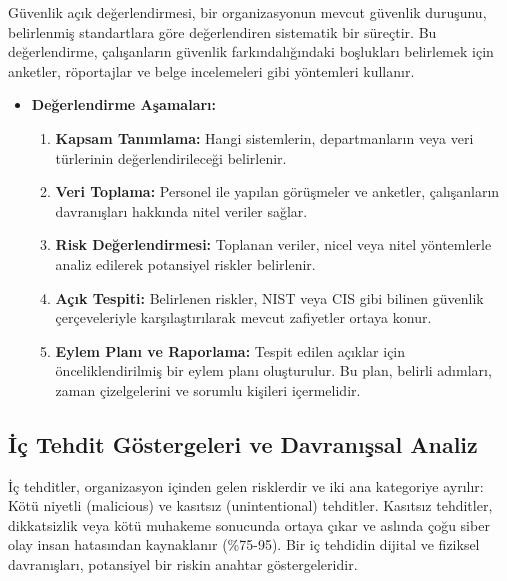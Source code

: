 Güvenlik açık değerlendirmesi, bir organizasyonun mevcut güvenlik duruşunu, belirlenmiş standartlara göre değerlendiren sistematik bir süreçtir. Bu değerlendirme, çalışanların güvenlik farkındalığındaki boşlukları belirlemek için anketler, röportajlar ve belge incelemeleri gibi yöntemleri kullanır.
\begin{itemize}
    \item \textbf{Değerlendirme Aşamaları:}
    \begin{enumerate}
        \item \textbf{Kapsam Tanımlama:} Hangi sistemlerin, departmanların veya veri türlerinin değerlendirileceği belirlenir.
        \item \textbf{Veri Toplama:} Personel ile yapılan görüşmeler ve anketler, çalışanların davranışları hakkında nitel veriler sağlar.
        \item \textbf{Risk Değerlendirmesi:} Toplanan veriler, nicel veya nitel yöntemlerle analiz edilerek potansiyel riskler belirlenir.
        \item \textbf{Açık Tespiti:} Belirlenen riskler, NIST veya CIS gibi bilinen güvenlik çerçeveleriyle karşılaştırılarak mevcut zafiyetler ortaya konur.
        \item \textbf{Eylem Planı ve Raporlama:} Tespit edilen açıklar için önceliklendirilmiş bir eylem planı oluşturulur. Bu plan, belirli adımları, zaman çizelgelerini ve sorumlu kişileri içermelidir.
    \end{enumerate}
\end{itemize}

\subsection{İç Tehdit Göstergeleri ve Davranışsal Analiz}

İç tehditler, organizasyon içinden gelen risklerdir ve iki ana kategoriye ayrılır: Kötü niyetli (malicious) ve kasıtsız (unintentional) tehditler. Kasıtsız tehditler, dikkatsizlik veya kötü muhakeme sonucunda ortaya çıkar ve aslında çoğu siber olay insan hatasından kaynaklanır (\%75-95). Bir iç tehdidin dijital ve fiziksel davranışları, potansiyel bir riskin anahtar göstergeleridir.

